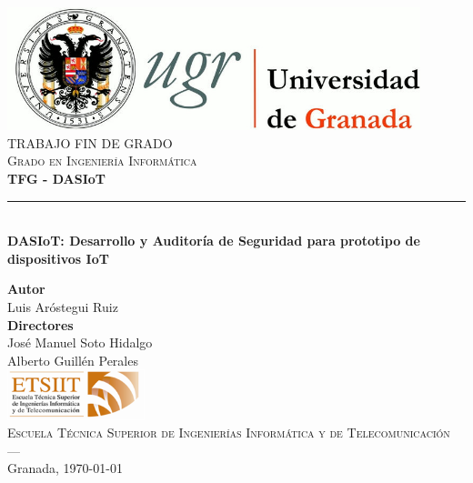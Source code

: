 \begin{titlepage}
 
 
\newlength{\centeroffset}
\setlength{\centeroffset}{-0.5\oddsidemargin}
\addtolength{\centeroffset}{0.5\evensidemargin}
\thispagestyle{empty}

\noindent\hspace*{\centeroffset}\begin{minipage}{\textwidth}

\centering
\includegraphics[width=0.9\textwidth]{imagenes/logo_ugr.jpg}\\[1.4cm]

\textsc{ \Large TRABAJO FIN DE GRADO\\[0.2cm]}
\textsc{ Grado en Ingeniería Informática}\\[1cm]
% 
{\Huge\bfseries TFG - DASIoT\\
}
\noindent\rule[-1ex]{\textwidth}{3pt}\\[3.5ex]
{\large\bfseries DASIoT: Desarrollo y Auditoría de Seguridad para prototipo de dispositivos IoT}
\end{minipage}

\vspace{2.5cm}
\noindent\hspace*{\centeroffset}\begin{minipage}{\textwidth}
\centering

\textbf{Autor}\\ {Luis Aróstegui Ruiz}\\[2.5ex]
\textbf{Directores}\\
{José Manuel Soto Hidalgo\\
Alberto Guillén Perales}\\[2cm]
\includegraphics[width=0.3\textwidth]{imagenes/etsiit_logo.png}\\[0.1cm]
\textsc{Escuela Técnica Superior de Ingenierías Informática y de Telecomunicación}\\
\textsc{---}\\
Granada, \today
\end{minipage}
\end{titlepage}


